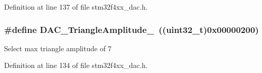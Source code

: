 Definition at line 137 of file stm32f4xx\-\_\-dac.\-h.

\hypertarget{group___d_a_c__lfsrunmask__triangleamplitude_gad3f31de1277836df1109576a53c47e87}{
\subsubsection[{D\-A\-C\-\_\-\-Triangle\-Amplitude\-\_\-7}]{\setlength{\rightskip}{0pt plus 5cm}\#define D\-A\-C\-\_\-\-Triangle\-Amplitude\-\_~((uint32\-\_\-t)0x00000200)}}\label{group___d_a_c__lfsrunmask__triangleamplitude_gad3f31de1277836df1109576a53c47e87}
Select max triangle amplitude of 7 

Definition at line 134 of file stm32f4xx\-\_\-dac.\-h.


